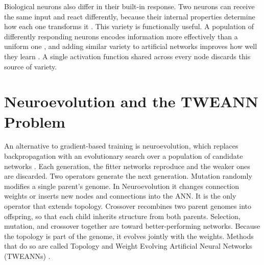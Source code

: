 Biological neurons also differ in their built-in response.
Two neurons can receive the same input and react differently, because their internal properties determine how each one transforms it \parencite{drion_ion_2015}.
This variety is functionally useful.
A population of differently responding neurons encodes information more effectively than a uniform one \parencite{tripathy_intermediate_2013}, and adding similar variety to artificial networks improves how well they learn \parencite{perez-nieves_neural_2021}.
A single activation function shared across every node discards this source of variety.



\section{Neuroevolution and the TWEANN Problem}
\label{subsec:neuroevolution}


An alternative to gradient-based training is neuroevolution, which replaces backpropagation with an evolutionary search over a population of candidate networks \parencite{stanley_designing_2019}.
Each generation, the fitter networks reproduce and the weaker ones are discarded.
Two operators generate the next generation.
Mutation randomly modifies a single parent's genome. In Neuroevolution it changes connection weights or inserts new nodes and connections into the ANN. It is the only operator that extends topology.
Crossover recombines two parent genomes into offspring, so that each child inherits structure from both parents.
Selection, mutation, and crossover together are  toward better-performing networks.
Because the topology is part of the genome, it evolves jointly with the weights. Methods that do so are called Topology and Weight Evolving Artificial Neural Networks (TWEANNs) \parencite{stanley_evolving_2002}.

